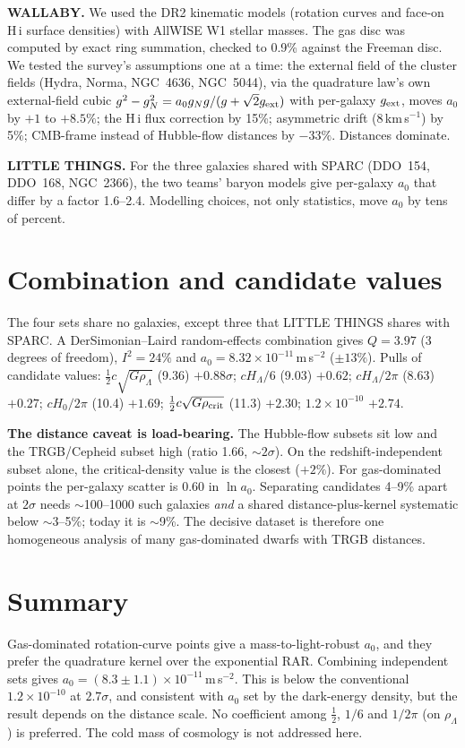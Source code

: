 \documentclass[10pt]{article}
\begin{document}
\textbf{WALLABY.} We used the DR2 kinematic models (rotation curves and face-on H\,{\sc i} surface densities) with AllWISE W1 stellar masses. The gas disc was computed by exact ring summation, checked to 0.9\% against the Freeman disc. We tested the survey's assumptions one at a time: the external field of the cluster fields (Hydra, Norma, NGC~4636, NGC~5044), via the quadrature law's own external-field cubic $g^2-g_N^2=a_0g_Ng/(g+\sqrt2g_{\rm ext})$ with per-galaxy $g_{\rm ext}$, moves $a_0$ by $+1$ to $+8.5\%$; the H\,{\sc i} flux correction by 15\%; asymmetric drift (8\,km\,s$^{-1}$) by 5\%; CMB-frame instead of Hubble-flow distances by $-33\%$. Distances dominate.

\textbf{LITTLE THINGS.} For the three galaxies shared with SPARC (DDO~154, DDO~168, NGC~2366), the two teams' baryon models give per-galaxy $a_0$ that differ by a factor 1.6--2.4. Modelling choices, not only statistics, move $a_0$ by tens of percent.

\section{Combination and candidate values}
The four sets share no galaxies, except three that LITTLE THINGS shares with SPARC. A DerSimonian--Laird random-effects combination gives $Q=3.97$ (3 degrees of freedom), $I^2=24\%$ and $a_0=8.32\times10^{-11}$\,m\,s$^{-2}$ ($\pm13\%$). Pulls of candidate values:
$\tfrac12c\sqrt{G\rho_\Lambda}$ (9.36) $+0.88\sigma$; $cH_\Lambda/6$ (9.03) $+0.62$; $cH_\Lambda/2\pi$ (8.63) $+0.27$; $cH_0/2\pi$ (10.4) $+1.69$; $\tfrac12c\sqrt{G\rho_{\rm crit}}$ (11.3) $+2.30$; $1.2\times10^{-10}$ $+2.74$.

\textbf{The distance caveat is load-bearing.} The Hubble-flow subsets sit low and the TRGB/Cepheid subset high (ratio 1.66, $\sim2\sigma$). On the redshift-independent subset alone, the critical-density value is the closest ($+2\%$). For gas-dominated points the per-galaxy scatter is 0.60 in $\ln a_0$. Separating candidates 4--9\% apart at $2\sigma$ needs $\sim$100--1000 such galaxies \emph{and} a shared distance-plus-kernel systematic below $\sim$3--5\%; today it is $\sim$9\%. The decisive dataset is therefore one homogeneous analysis of many gas-dominated dwarfs with TRGB distances.

\section{Summary}
Gas-dominated rotation-curve points give a mass-to-light-robust $a_0$, and they prefer the quadrature kernel over the exponential RAR. Combining independent sets gives $a_0=(8.3\pm1.1)\times10^{-11}$\,m\,s$^{-2}$. This is below the conventional $1.2\times10^{-10}$ at $2.7\sigma$, and consistent with $a_0$ set by the dark-energy density, but the result depends on the distance scale. No coefficient among $\tfrac12$, $1/6$ and $1/2\pi$ (on $\rho_\Lambda$) is preferred. The cold mass of cosmology is not addressed here.
\end{document}
